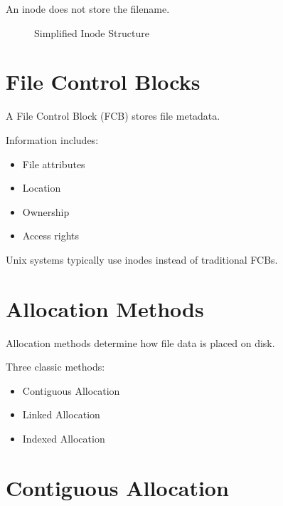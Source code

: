 An inode does not store the filename.

\begin{figure}[H]
\centering
{}
\caption{Simplified Inode Structure}
\end{figure}

\section{File Control Blocks}

A File Control Block (FCB) stores file metadata.

Information includes:

\begin{itemize}
\item File attributes
\item Location
\item Ownership
\item Access rights
\end{itemize}

Unix systems typically use inodes instead of traditional FCBs.

\section{Allocation Methods}

Allocation methods determine how file data is placed on disk.

Three classic methods:

\begin{itemize}
\item Contiguous Allocation
\item Linked Allocation
\item Indexed Allocation
\end{itemize}

\section{Contiguous Allocation}

